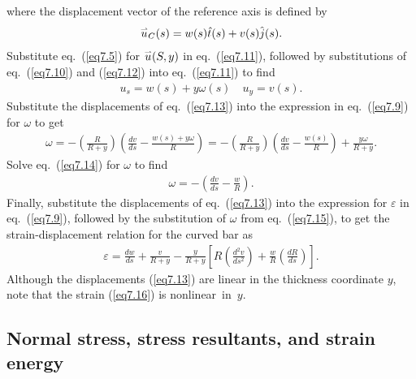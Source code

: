 \documentclass{AeroStructure-ERJohnson}
\def\harp#1{\smash{\mathord{\buildrel{\lower3pt\hbox{$\scriptscriptstyle\rightharpoonup$}}\over{#1}}}}
\begin{document}
where the displacement vector of the reference axis is defined by
\begin{align}\label{eq7.12}
\harp{u}_{C}(s)=w(s) \hat{t}(s)+v(s) \hat{j}(s).
\end{align}
Substitute eq.~(\ref{eq7.5}) for $\harp{u}(S, y)$ in eq.~(\ref{eq7.11}), followed by substitutions of eq.~(\ref{eq7.10}) and (\ref{eq7.12}) into eq.~(\ref{eq7.11}) to find
\begin{align}\label{eq7.13}
u_{s}=w(s)+y \omega(s) \quad u_{y}=v(s).
\end{align}
Substitute the displacements of eq.~(\ref{eq7.13}) into the expression in eq.~(\ref{eq7.9}) for $\omega$ to get
\begin{align}\label{eq7.14}
\omega=-\left(\frac{R}{R+y}\right)\left(\frac{d v}{d s}-\frac{w(s)+y \omega}{R}\right)=-\left(\frac{R}{R+y}\right)\left(\frac{d v}{d s}-\frac{w(s)}{R}\right)+\frac{y \omega}{R+y}.
\end{align}
Solve eq.~(\ref{eq7.14}) for $\omega$ to find
\begin{align}\label{eq7.15}
\omega=-\left(\frac{d v}{d s}-\frac{w}{R}\right).
\end{align}
Finally, substitute the displacements of eq.~(\ref{eq7.13}) into the expression for $\varepsilon$ in eq.~(\ref{eq7.9}), followed by the substitution of $\omega$ from eq.~(\ref{eq7.15}), to get the strain-displacement relation for the curved bar as
\begin{align}\label{eq7.16}
\varepsilon=\frac{d w}{d s}+\frac{v}{R+y}-\frac{y}{R+y}\left[R\left(\frac{d^{2} v}{d s^{2}}\right)+\frac{w}{R}\left(\frac{d R}{d s}\right)\right].
\end{align}
Although the displacements (\ref{eq7.13}) are linear in the thickness coordinate $y$, note that the strain (\ref{eq7.16}) is non\-linear~in~$y$.

\subsection{Normal stress, stress resultants, and strain energy}\label{sec7.1.2}
\end{document}

